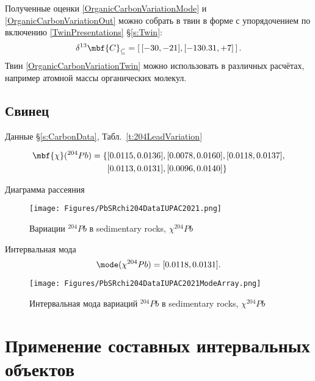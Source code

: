 \documentclass[a5paper,openany]{book}
\begin{document}
Полученные оценки \eqref{OrganicCarbonVariationMode} и \eqref{OrganicCarbonVariationOut} можно собрать в твин в форме с упорядочением по включению \eqref{TwinPresentations} \S\ref{s:Twin}:
\begin{equation}\label{OrganicCarbonVariationTwin}
\delta ^{13}\mbf{C}_{\subseteq} = \left[ \, [-30, -21], [-130.31, +7] \, \right].
\end{equation}
Твин \eqref{OrganicCarbonVariationTwin} можно использовать в различных расчётах, например атомной массы органических молекул.

\subsection{Свинец}

Данные \S\ref{s:CarbonData}, Табл.~\ref{t:204LeadVariation}

\begin{align}
\mbf{\chi} (^{204}Pb) =	 \{	& [ 0.0115, 0.0136 ], 	[ 0.0078, 0.0160 ], [ 0.0118, 0.0137 ] , \nonumber \\
& [ 0.0113, 0.0131 ], [ 0.0096, 0.0140 ] 	\} 
\end{align}

Диаграмма рассеяния 
\begin{figure}[ht] 
	\centering\small
	\unitlength=1mm
	{\texttt{[image: Figures/PbSRchi204DataIUPAC2021.png]}} 
	\caption{Вариации $^{204}Pb$ в sedimentary rocks,  $ \chi ^{204}Pb$}
	\label{f:PbSRchi204DataIUPAC2021}
\end{figure}

Интервальная мода 
\begin{equation}
	\mode ( \chi ^{204}Pb) = [0.0118, 0.0131].
\end{equation}

\begin{figure}[ht] 
	\begin{center}
		\unitlength=1mm
		{\texttt{[image: Figures/PbSRchi204DataIUPAC2021ModeArray.png]}} 
		\caption{Интервальная мода 
			вариаций  $^{204}Pb$ в sedimentary rocks,  $ \chi ^{204}Pb$} 
		\label{f:PbSRchi204DataIUPAC2021Mode}
	\end{center}	
\end{figure}

\section{Применение составных интервальных объектов}
\end{document}
